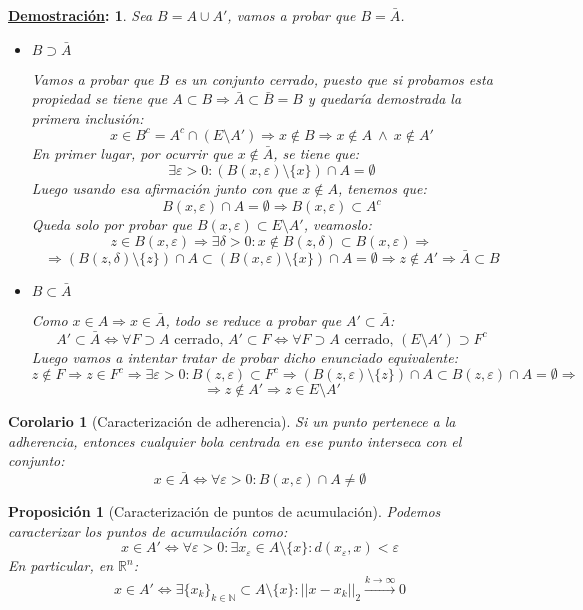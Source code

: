 \documentclass[10pt,a4paper,openright]{book}
\theoremstyle{break}
\newtheorem*{coro}{Corolario}
\newtheorem*{prop}{Proposición}
\newtheorem*{demo}{\underline{Demostración}:}
\begin{document}
\begin{demo}
Sea $B= A\cup A'$, vamos a probar que $B=\bar{A}$.
\begin{itemize}
\item $B \supset \bar{A}$

Vamos a probar que $B$ es un conjunto cerrado, puesto que si probamos esta propiedad se tiene que $A\subset B\Rightarrow \bar{A}\subset \bar{B} = B$ y quedaría demostrada la primera inclusión:
$$x \in B^{c} = A^{c} \cap (E\setminus A')\Rightarrow x\notin B \Rightarrow x\notin A \ \wedge \ x\notin A'$$
En primer lugar, por ocurrir que $x\notin \bar{A}$, se tiene que:
$$\exists \varepsilon > 0 : \left( B(x,\varepsilon)\setminus\{x\}\right)\cap A = \emptyset$$
Luego usando esa afirmación junto con que $x\notin A$, tenemos que:
$$B(x,\varepsilon)\cap A = \emptyset\Rightarrow B(x,\varepsilon) \subset A^{c}$$
Queda solo por probar que $B(x,\varepsilon)\subset E\setminus A'$, veamoslo:
$$z\in B(x,\varepsilon)\Rightarrow \exists \delta > 0 : x\notin B(z, \delta)\subset B(x,\varepsilon) \Rightarrow$$
$$\Rightarrow \left(B(z,\delta)\setminus \{z\}\right)\cap A \subset \left(B(x,\varepsilon)\setminus\{x\}\right)\cap A = \emptyset\Rightarrow z \notin A' \Rightarrow \bar{A}\subset B$$

\item $B\subset \bar{A}$

Como $x\in A\Rightarrow x \in \bar{A}$, todo se reduce a probar que $A'\subset \bar{A}$:
$$A'\subset \bar{A} \Leftrightarrow \forall F\supset A \mbox{ cerrado, } A'\subset F \Leftrightarrow \forall F \supset A \mbox{ cerrado, }(E\setminus A')\supset F^{c}$$
Luego vamos a intentar tratar de probar dicho enunciado equivalente:
$$z\notin F \Rightarrow z \in F^{c} \Rightarrow \exists \varepsilon > 0 : B(z,\varepsilon)\subset F^{c}\Rightarrow \left(B(z,\varepsilon)\setminus\{z\}\right)\cap A \subset B(z,\varepsilon)\cap A = \emptyset \Rightarrow$$
$$\Rightarrow z \notin A' \Rightarrow z \in E\setminus A'$$
\end{itemize}
\end{demo}

\begin{coro}[Caracterización de adherencia]
Si un punto pertenece a la adherencia, entonces cualquier bola centrada en ese punto interseca con el conjunto:
$$x\in \bar{A}\Leftrightarrow \forall \varepsilon >0: B(x,\varepsilon)\cap A \neq \emptyset$$
\end{coro}

\begin{prop}[Caracterización de puntos de acumulación]
Podemos caracterizar los puntos de acumulación como:
$$x\in A' \Leftrightarrow \forall \varepsilon > 0: \exists x_{\varepsilon} \in A\setminus\{x\}: d(x_\varepsilon, x)< \varepsilon$$
En particular, en $\mathbb{R}^{n}$:
$$x\in A' \Leftrightarrow \exists \{x_k\}_{k\in \mathbb N}\subset A\setminus\{x\}: ||x-x_k||_{2}\xrightarrow{k\rightarrow\infty} 0$$
\end{prop}
\end{document}
